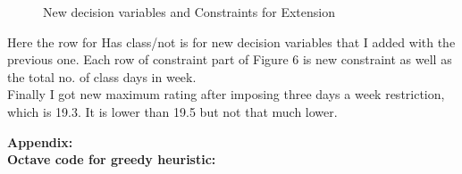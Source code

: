 \documentclass[paper=letter, fontsize=11pt]{scrartcl} %
\begin{document}
\begin{figure}[H]
  
  \centering
    \caption{New decision variables and Constraints for Extension}
\end{figure}
Here the row for Has class/not is for new decision variables that I added with the previous one. Each row of constraint part of Figure 6 is new constraint as well as the total no. of class days in week.\\
Finally I got new maximum rating after imposing three days a week restriction, which is 19.3. It is lower than 19.5 but not that much lower.   


\newpage
\Large \textbf{Appendix:}\\
\newline
 \normalsize \textbf{Octave code for greedy heuristic:}
\end{document}
